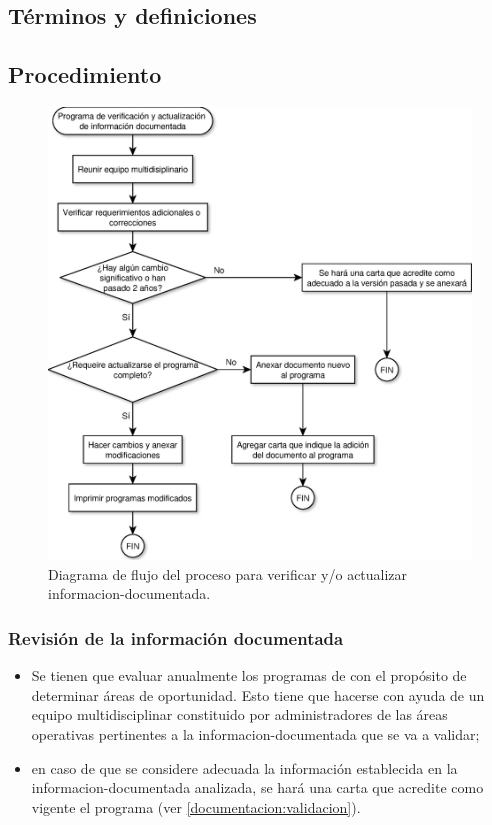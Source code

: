 \subsection{Términos y definiciones}
\begin{description}
\end{description}

\subsection{Procedimiento}
\begin{figure}[htb]
    \centering
    \includegraphics[width=0.5\linewidth]{src/diagramas/G1_AV1.eps}
    \caption{Diagrama de flujo del proceso para verificar y/o actualizar \gls{informacion-documentada}.}
\end{figure}

\subsubsection{Revisión de la información documentada}
\label{documentacion:revision}
\begin{itemize}
\item Se tienen que evaluar anualmente los programas de  con el propósito de determinar áreas de oportunidad. Esto tiene que hacerse con ayuda de un equipo multidisciplinar constituido por administradores de las áreas operativas pertinentes a la \gls{informacion-documentada} que se va a validar;
\item en caso de que se considere adecuada la información establecida en la \gls{informacion-documentada} analizada, se hará una carta que acredite como vigente el programa (ver \cref{documentacion:validacion}).
\end{itemize}

